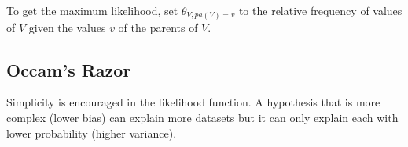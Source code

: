 \documentclass[11pt]{article}
\begin{document}
To get the maximum likelihood, set \(\theta_{V, pa(V) = v}\) to the relative frequency of
values of \(V\) given the values \(v\) of the parents of \(V\).
\subsection{Occam's Razor}
\label{sec:orgcbad707}
Simplicity is encouraged in the likelihood function.
A hypothesis that is more complex (lower bias) can explain more datasets but it
can only explain each with lower probability (higher variance).
\end{document}
